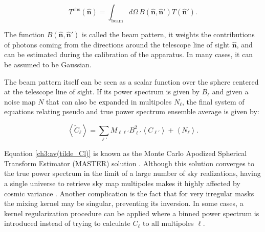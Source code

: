 \documentclass[openany,a4paper,12pt,oneside]{book}
\newcommand{\av}[1]{\left\langle #1 \right\rangle} %
\begin{document}
\begin{spacing}{1.5}
\begin{equation}\label{def:beam_pattern}
	T^\text{obs}(\hat{\mathbf{n}})=\int_\text{beam} d\Omega\, B(\hat{\mathbf{n}}, \hat{\mathbf{n}}') T(\hat{\mathbf{n}} ').
\end{equation}

The function $B(\hat{\mathbf{n}}, \hat{\mathbf{n}}')$ is called the beam pattern, it weights the contributions of photons coming from the directions around the telescope line of sight $\hat{\mathbf{n}}$, and can be estimated during the calibration of the apparatus. In many cases, it can be assumed to be Gaussian. %


The beam pattern itself can be seen as a scalar function over the sphere centered at the telescope line of sight. If its power spectrum is given by $B_\ell$ and given a noise map $N$ that can also be expanded in multipoles $N_\ell$, the final system of equations relating pseudo and true power spectrum ensemble average is given by:

\begin{equation}\label{ch3:av(tilde_Cl)}
    \av{\tilde{C}_\ell}=\sum_{\ell'} M_{\ell \ell'}B_{\ell'}^2\av{C_{\ell'}}+\av{N_\ell}.
\end{equation}

Equation \ref{ch3:av(tilde_Cl)} is known as the Monte Carlo Apodized
Spherical Transform Estimator (MASTER) solution \cite{Hivon_2002}. Although this solution converges to the true power spectrum in the limit of a large number of sky realizations, having a single universe to retrieve sky map multipoles makes it highly affected by cosmic variance \cite{Moura-Santos_2016}. Another complication is the fact that for very irregular masks the mixing kernel may be singular, preventing its inversion. In some cases, a kernel regularization procedure can be applied where a binned power spectrum is introduced instead of trying to calculate $C_{\ell}$ to all multipoles $\ell$.


\end{spacing}
\end{document}

